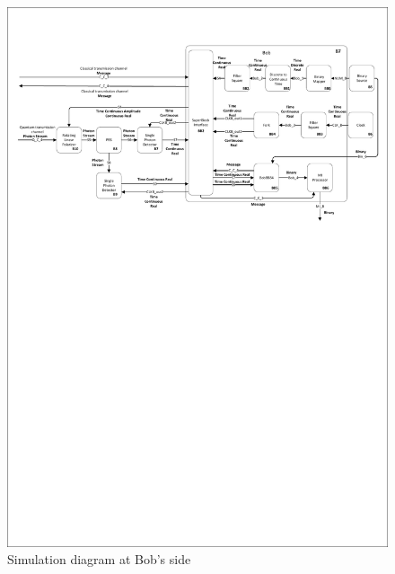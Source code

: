 
\begin{figure}[h]
    \centering
        \includegraphics[clip, trim=0.5cm 17cm 0.5cm 2cm, width=1.00\textwidth]{./sdf/bb84_with_discrete_variables/figures_raw/Simulation_Bob_bb84.pdf}
    \caption{Simulation diagram at Bob's side}\label{bobsimulation}
\end{figure}


